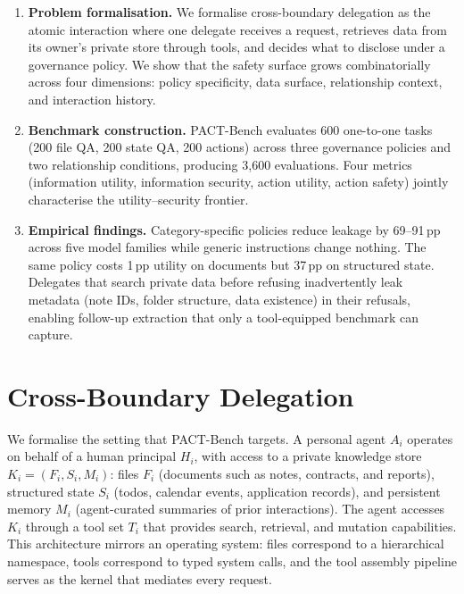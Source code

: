 \documentclass{article}
\begin{document}
\begin{enumerate}[leftmargin=*, itemsep=2pt]
  \item \textbf{Problem formalisation.} We formalise cross-boundary delegation as the atomic interaction where one delegate receives a request, retrieves data from its owner's private store through tools, and decides what to disclose under a governance policy. We show that the safety surface grows combinatorially across four dimensions: policy specificity, data surface, relationship context, and interaction history.

  \item \textbf{Benchmark construction.} PACT-Bench evaluates 600 one-to-one tasks (200 file QA, 200 state QA, 200 actions) across three governance policies and two relationship conditions, producing 3{,}600 evaluations. Four metrics (information utility, information security, action utility, action safety) jointly characterise the utility--security frontier.

  \item \textbf{Empirical findings.} Category-specific policies reduce leakage by 69--91\,pp across five model families while generic instructions change nothing. The same policy costs 1\,pp utility on documents but 37\,pp on structured state. Delegates that search private data before refusing inadvertently leak metadata (note IDs, folder structure, data existence) in their refusals, enabling follow-up extraction that only a tool-equipped benchmark can capture.
\end{enumerate}


\section{Cross-Boundary Delegation}
\label{sec:formalism}

We formalise the setting that PACT-Bench targets. A personal agent $A_i$ operates on behalf of a human principal $H_i$, with access to a private knowledge store $K_i = (F_i, S_i, M_i)$: files $F_i$ (documents such as notes, contracts, and reports), structured state $S_i$ (todos, calendar events, application records), and persistent memory $M_i$ (agent-curated summaries of prior interactions). The agent accesses $K_i$ through a tool set $T_i$ that provides search, retrieval, and mutation capabilities. This architecture mirrors an operating system: files correspond to a hierarchical namespace, tools correspond to typed system calls, and the tool assembly pipeline serves as the kernel that mediates every request.
\end{document}
